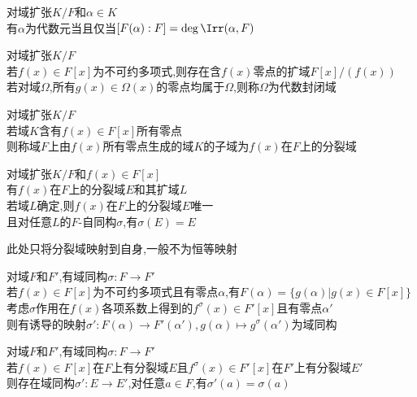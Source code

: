 \begin{tuilun}
对域扩张$K/F$和$\alpha \in K$\\
有$\alpha$为代数元当且仅当$[F(\alpha):F]=\deg \Irr (\alpha, F)$
\end{tuilun}

\begin{dingli}
对域扩张$K/F$\\
若$f(x)\in F[x]$为不可约多项式,则存在含$f(x)$零点的扩域$F[x]/(f(x))$\\
若对域$\Omega$,所有$g(x)\in \Omega(x)$的零点均属于$\Omega$,则称$\Omega$为代数封闭域
\end{dingli}

\begin{dingli}
对域扩张$K/F$\\
若域$K$含有$f(x)\in F[x]$所有零点\\
则称域$F$上由$f(x)$所有零点生成的域$K$的子域为$f(x)$在$F$上的分裂域
\end{dingli}

\begin{dingli}
对域扩张$K/F$和$f(x)\in F[x]$\\
有$f(x)$在$F$上的分裂域$E$和其扩域$L$\\
若域$L$确定,则$f(x)$在$F$上的分裂域$E$唯一\\
且对任意$L$的$F$-自同构$\sigma$,有$\sigma(E)=E$
\end{dingli}

\begin{zhu}
此处只将分裂域映射到自身,一般不为恒等映射
\end{zhu}

\begin{dingli}
对域$F$和$F'$,有域同构$\sigma:F\to F'$\\
若$f(x)\in F[x]$为不可约多项式且有零点$\alpha$,有$F(\alpha)=\{g(\alpha)|g(x)\in F[x]\}$\\
考虑$\sigma$作用在$f(x)$各项系数上得到的$f^{\sigma}(x)\in F'[x]$且有零点$\alpha'$\\
则有诱导的映射$\sigma':F(\alpha)\to F'(\alpha'),g(\alpha)\mapsto g^{\sigma}(\alpha')$为域同构
\end{dingli}

\begin{dingli}
对域$F$和$F'$,有域同构$\sigma:F\to F'$\\
若$f(x)\in F[x]$在$F$上有分裂域$E$且$f^{\sigma}(x)\in F'[x]$在$F'$上有分裂域$E'$\\
则存在域同构$\sigma':E\to E'$,对任意$a\in F$,有$\sigma'(a)=\sigma(a)$
\end{dingli}

